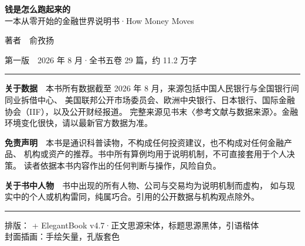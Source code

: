 \thispagestyle{empty}
\null\vfill
\noindent
\begin{minipage}{\linewidth}
\footnotesize\color{inkgray}
\setlength{\parskip}{0.7em}

{\normalsize\color{inkbody}\textbf{钱是怎么跑起来的}}\\
一本从零开始的金融世界说明书\quad·\quad How Money Moves

著者　俞孜扬

第一版　2026 年 8 月\quad·\quad 全书五卷 29 篇，约 11.2 万字

\vspace{0.4em}
{\color{rulegray}\rule{\linewidth}{0.4pt}}

\textbf{关于数据}　本书所有数据截至 2026 年 8 月，来源包括中国人民银行与全国银行间同业拆借中心、
美国联邦公开市场委员会、欧洲中央银行、日本银行、国际金融协会（IIF），以及公开财经报道。
完整来源见书末〈参考文献与数据来源〉。金融环境变化很快，请以最新官方数据为准。

\textbf{免责声明}　本书是通识科普读物，不构成任何投资建议，也不构成对任何金融产品、
机构或资产的推荐。书中所有算例均用于说明机制，不可直接套用于个人决策。
读者依据本书内容作出的任何判断与操作，风险自负。

\textbf{关于书中人物}　书中出现的所有人物、公司与交易均为说明机制而虚构，
如与现实中的个人或机构雷同，纯属巧合。引用的公开数据与机构观点除外。

\vspace{0.4em}
{\color{rulegray}\rule{\linewidth}{0.4pt}}

排版：\XeLaTeX{} + ElegantBook v4.7\quad·\quad 正文思源宋体，标题思源黑体，引语楷体\\
封面插画：手绘矢量，孔版套色
\end{minipage}
\vspace{1.5cm}
\clearpage
